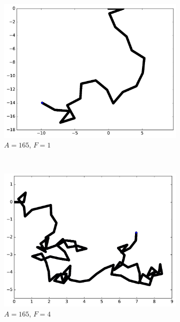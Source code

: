 	\begin{figure}[htb]
		\begin{subfigure}[t]{\subImgWmo}
			\centering
			\includegraphics[width=\textwidth]{figures/ch3/synTraj_219_165_1}
			\caption[$A = 165$, $F=1$]{$A = 165$, $F=1$}
			\label{fig:synTraj_219_165_1}
		\end{subfigure}
		~
		\begin{subfigure}[t]{\subImgWmo}
			\centering
			\includegraphics[width=\textwidth]{figures/ch3/synTraj_219_165_4}
			\caption[$A = 165$, $F=4$]{$A = 165$, $F=4$}
			\label{fig:synTraj_219_165_4}
		\end{subfigure}
		~
		\begin{subfigure}[t]{\subImgWmo}

\end{subfigure}
\end{figure}
